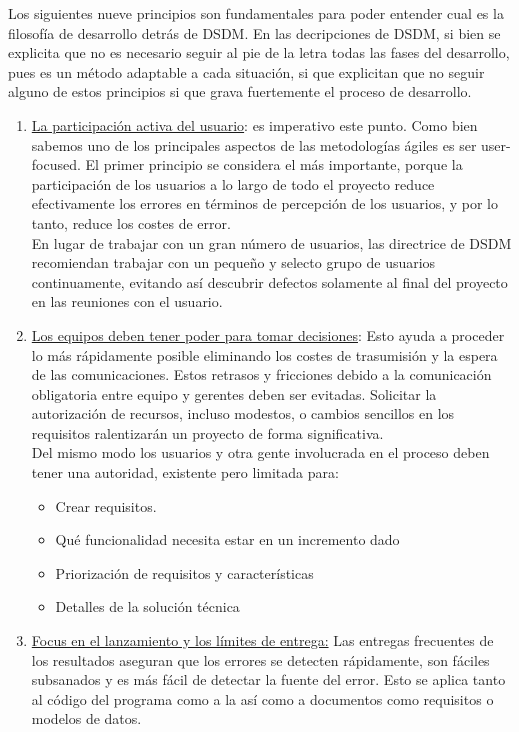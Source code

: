 \documentclass[12pt,a4paper]{article}
\begin{document}
Los siguientes nueve principios son fundamentales para poder entender cual es la filosofía de desarrollo detrás de DSDM. En las decripciones de DSDM, si bien se explicita que no es necesario seguir al pie de la letra todas las fases del desarrollo, pues es un método adaptable a cada situación, si que explicitan que no seguir alguno de estos principios si que grava fuertemente el proceso de desarrollo.

\begin{enumerate}
	\item \underline{La participación activa del usuario}: es imperativo este punto. Como bien sabemos uno de los principales aspectos de las metodologías ágiles es ser user-focused. El primer principio se considera el más importante, porque la participación de los usuarios a lo largo de todo el proyecto reduce efectivamente los errores en términos de percepción de los usuarios, y por lo tanto, reduce los costes de error. \\


En lugar de trabajar con un gran número de usuarios, las directrice de  DSDM  recomiendan trabajar con un pequeño y selecto grupo de usuarios continuamente, evitando así descubrir defectos solamente al final del proyecto en las reuniones con el usuario.\\


\item \underline{Los equipos deben tener poder para tomar decisiones}: Esto ayuda a proceder lo más rápidamente posible eliminando los costes de trasumisión y la espera de las comunicaciones. Estos retrasos y fricciones debido a la comunicación obligatoria entre equipo y gerentes deben ser evitadas. Solicitar
la autorización de recursos, incluso modestos, o cambios sencillos en los requisitos ralentizarán un proyecto de forma significativa.\\

 Del mismo modo los usuarios y otra gente involucrada en el proceso deben tener una autoridad, existente pero limitada para:
\begin{itemize}
	\item  Crear requisitos.
    \item Qué funcionalidad necesita estar en un incremento dado
    \item Priorización de requisitos y características
    \item Detalles de la solución técnica
\end{itemize}


\item \underline{Focus en el lanzamiento y los límites de entrega:} Las entregas frecuentes de los resultados aseguran que los errores se detecten rápidamente, son fáciles subsanados y es más fácil de detectar la fuente del error. Esto se aplica tanto al código del programa como a la
así como a documentos como requisitos o modelos de datos.



\end{enumerate}
\end{document}
